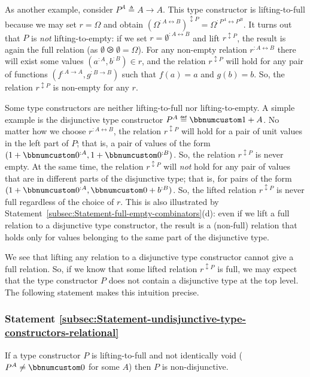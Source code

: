 As another example, consider $P^{A}\triangleq A\rightarrow A$. This
type constructor is lifting-to-full because we may set $r=\Omega$
and obtain $(\Omega^{:A\leftrightarrow B})^{\updownarrow P}=\Omega^{:P^{A}\leftrightarrow P^{B}}$.
It turns out that $P$ is \emph{not} lifting-to-empty: if we set $r=\emptyset^{:A\leftrightarrow B}$
and lift $r^{\updownarrow P}$, the result is again the full relation
(as $\emptyset\ogreaterthan\emptyset=\Omega$). For any non-empty
relation $r^{:A\leftrightarrow B}$ there will exist some values $(a^{:A},b^{:B})\in r$,
and the relation $r^{\updownarrow P}$ will hold for any pair of functions
$(f^{:A\rightarrow A},g^{:B\rightarrow B})$ such that $f(a)=a$ and
$g(b)=b$. So, the relation $r^{\updownarrow P}$ is non-empty for
any $r$.

Some type constructors are neither lifting-to-full nor lifting-to-empty.
A simple example is the disjunctive type constructor $P^{A}\triangleq\bbnum 1+A$.
No matter how we choose $r^{:A\leftrightarrow B}$, the relation $r^{\updownarrow P}$
will hold for a pair of unit values in the left part of $P$; that
is, a pair of values of the form $(1+\bbnum 0^{:A},1+\bbnum 0^{:B})$.
So, the relation $r^{\updownarrow P}$ is never empty. At the same
time, the relation $r^{\updownarrow P}$ will \emph{not} hold for
any pair of values that are in different parts of the disjunctive
type; that is, for pairs of the form $(1+\bbnum 0^{:A},\bbnum 0+b^{:B})$.
So, the lifted relation $r^{\updownarrow P}$ is never full regardless
of the choice of $r$. This is also illustrated by Statement~\ref{subsec:Statement-full-empty-combinators}(d):
even if we lift a full relation to a disjunctive type constructor,
the result is a (non-full) relation that holds only for values belonging
to the same part of the disjunctive type.

We see that lifting any relation to a disjunctive type constructor
cannot give a full relation. So, if we know that some lifted relation
$r^{\updownarrow P}$ is full, we may expect that the type constructor
$P$ does not contain a disjunctive type at the top level. The following
statement makes this intuition precise.

\subsubsection{Statement \label{subsec:Statement-undisjunctive-type-constructors-relational}\ref{subsec:Statement-undisjunctive-type-constructors-relational}}

If a type constructor $P$ is lifting-to-full and not identically
void ($P^{A}\neq\bbnum 0$ for some $A$) then $P$ is non-disjunctive.

